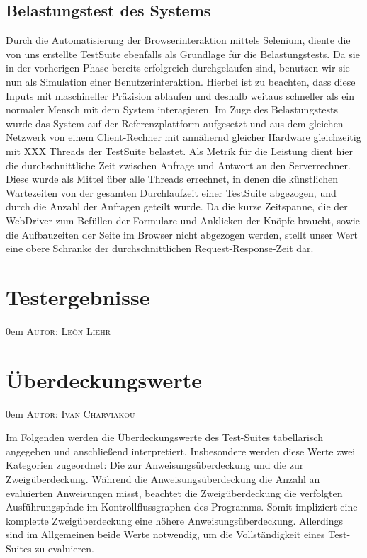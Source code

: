 \documentclass{article}
\makeatletter
\newcommand{\sectionauthor}[1]{
	{\parindent 0em \large \scshape Autor: #1 \par \nobreak \vspace*{1em}}
	\@afterheading
}
\makeatother
\begin{document}
\subsection{Belastungstest des Systems}
Durch die Automatisierung der Browserinteraktion mittels Selenium, diente die von uns erstellte TestSuite ebenfalls als Grundlage für die Belastungstests. Da sie in der vorherigen Phase bereits erfolgreich durchgelaufen sind, benutzen wir sie nun als Simulation einer Benutzerinteraktion. Hierbei ist zu beachten, dass diese Inputs mit maschineller Präzision ablaufen und deshalb weitaus schneller als ein normaler Mensch mit dem System interagieren. Im Zuge des Belastungstests wurde das System auf der Referenzplattform aufgesetzt und aus dem gleichen Netzwerk von einem Client-Rechner mit annähernd gleicher Hardware gleichzeitig mit XXX Threads der TestSuite belastet. Als Metrik für die Leistung dient hier die durchschnittliche Zeit zwischen Anfrage und Antwort an den Serverrechner. Diese wurde als Mittel über alle Threads errechnet, in denen die künstlichen Wartezeiten von der gesamten Durchlaufzeit einer TestSuite abgezogen, und durch die Anzahl der Anfragen geteilt wurde. Da die kurze Zeitspanne, die der WebDriver zum Befüllen der Formulare und Anklicken der Knöpfe braucht, sowie die Aufbauzeiten der Seite im Browser nicht abgezogen werden, stellt unser Wert eine obere Schranke der durchschnittlichen Request-Response-Zeit dar.

\newpage

\section{Testergebnisse}
\sectionauthor{León Liehr}



\newpage

\section{Überdeckungswerte}
\sectionauthor{Ivan Charviakou}

Im Folgenden werden die Überdeckungswerte des Test-Suites tabellarisch angegeben und anschließend interpretiert. 
Insbesondere werden diese Werte zwei Kategorien zugeordnet: Die zur Anweisungsüberdeckung und die zur Zweigüberdeckung. 
Während die Anweisungsüberdeckung die Anzahl an evaluierten Anweisungen misst, beachtet die Zweigüberdeckung die verfolgten Ausführungspfade im Kontrollflussgraphen des Programms.
Somit impliziert eine komplette Zweigüberdeckung eine höhere Anweisungsüberdeckung. 
Allerdings sind im Allgemeinen beide Werte notwendig, um die Vollständigkeit eines Test-Suites zu evaluieren.
\end{document}
